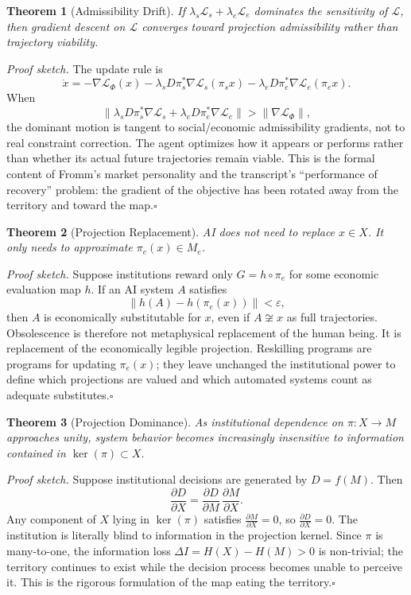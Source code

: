 \documentclass[12pt, a4paper]{article}
\theoremstyle{plain}
\newtheorem{theorem}{Theorem}
\theoremstyle{definition}
\theoremstyle{remark}
\begin{document}
\begin{theorem}[Admissibility Drift]
If $\lambda_s \mathcal{L}_s + \lambda_e \mathcal{L}_e$ dominates the sensitivity
of $\mathcal{L}$, then gradient descent on $\mathcal{L}$ converges toward
projection admissibility rather than trajectory viability.
\end{theorem}

\textit{Proof sketch.}
The update rule is
\[
\dot{x}
= -\nabla \mathcal{L}_\Phi(x)
- \lambda_s D\pi_s^\ast \nabla \mathcal{L}_s(\pi_s x)
- \lambda_e D\pi_e^\ast \nabla \mathcal{L}_e(\pi_e x).
\]
When
\[
\|\lambda_s D\pi_s^\ast \nabla \mathcal{L}_s
+ \lambda_e D\pi_e^\ast \nabla \mathcal{L}_e\|
> \|\nabla \mathcal{L}_\Phi\|,
\]
the dominant motion is tangent to social/economic admissibility gradients, not
to real constraint correction.
The agent optimizes how it appears or performs rather than whether its actual
future trajectories remain viable.
This is the formal content of Fromm's market personality and the transcript's
``performance of recovery'' problem: the gradient of the objective has been rotated
away from the territory and toward the map.\hfill$\square$

\begin{theorem}[Projection Replacement]
AI does not need to replace $x \in X$.
It only needs to approximate $\pi_e(x) \in M_e$.
\end{theorem}

\textit{Proof sketch.}
Suppose institutions reward only $G = h \circ \pi_e$ for some economic evaluation
map $h$.
If an AI system $A$ satisfies
\[
\|h(A) - h(\pi_e(x))\| < \varepsilon,
\]
then $A$ is economically substitutable for $x$, even if $A \not\cong x$ as
full trajectories.
Obsolescence is therefore not metaphysical replacement of the human being.
It is replacement of the economically legible projection.
Reskilling programs are programs for updating $\pi_e(x)$; they leave unchanged
the institutional power to define which projections are valued and which
automated systems count as adequate substitutes.\hfill$\square$

\begin{theorem}[Projection Dominance]
As institutional dependence on $\pi : X \to M$ approaches unity, system behavior
becomes increasingly insensitive to information contained in $\ker(\pi) \subset X$.
\end{theorem}

\textit{Proof sketch.}
Suppose institutional decisions are generated by $D = f(M)$.
Then
\[
\frac{\partial D}{\partial X}
= \frac{\partial D}{\partial M}\,\frac{\partial M}{\partial X}.
\]
Any component of $X$ lying in $\ker(\pi)$ satisfies $\frac{\partial M}{\partial X} = 0$,
so $\frac{\partial D}{\partial X} = 0$.
The institution is literally blind to information in the projection kernel.
Since $\pi$ is many-to-one, the information loss $\Delta I = H(X) - H(M) > 0$
is non-trivial; the territory continues to exist while the decision process
becomes unable to perceive it.
This is the rigorous formulation of the map eating the territory.\hfill$\square$
\end{document}
